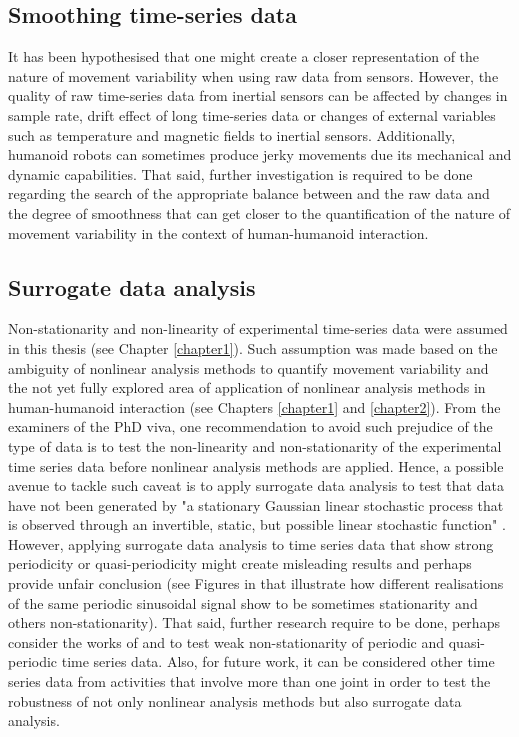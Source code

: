 \subsection*{Smoothing time-series data}
It has been hypothesised that one might create a closer 
representation of the nature of movement variability 
when using raw data from sensors.
However, the quality of raw time-series data from inertial
sensors can be affected by changes in sample rate, 
drift effect of long time-series data 
or changes of external variables such as 
temperature and magnetic fields to inertial sensors. 
Additionally, humanoid robots can sometimes produce
jerky movements due its mechanical and dynamic capabilities.
That said, further investigation is required to be done
regarding the search of the appropriate balance between 
and the raw data and the degree of smoothness 
that can get closer to the quantification of the nature of 
movement variability in the context of 
human-humanoid interaction. 

\subsection*{Surrogate data analysis}
Non-stationarity and non-linearity of experimental time-series data 
were assumed in this thesis 
(see Chapter \ref{chapter1}).
Such assumption was made based on the ambiguity of 
nonlinear analysis methods to quantify movement variability
and the not yet fully explored area of application of nonlinear analysis 
methods in human-humanoid interaction
(see Chapters \ref{chapter1} and \ref{chapter2}). 
From the examiners of the PhD viva, 
one recommendation to avoid such prejudice of the type of data  
is to test the non-linearity and non-stationarity  
of the experimental time series data before nonlinear analysis 
methods are applied.
Hence, a possible avenue to tackle such caveat 
is to apply surrogate data analysis to test that 
data have not been generated by "a stationary Gaussian linear
stochastic process that is observed through an invertible,
static, but possible linear stochastic function" 
\citep[p. 2]{schreiber2000}.
However, applying surrogate data analysis to time series data 
that show strong periodicity or quasi-periodicity 
might create misleading results and perhaps provide unfair 
conclusion 
(see Figures in  that illustrate
how different realisations of the same periodic sinusoidal signal 
show to be sometimes stationarity and others non-stationarity).
That said, further research require to be done,
perhaps consider the works of 
\cite{stam1998} and  \cite{small2002}
to test weak non-stationarity 
of periodic and quasi-periodic time series data.
Also, for future work, 
it can be considered other time series data from 
activities that involve more than one joint 
in order to test the robustness of 
not only nonlinear analysis methods but 
also surrogate data analysis.

